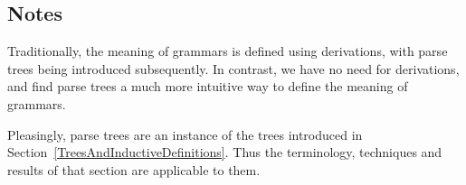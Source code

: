 \subsection{Notes}

Traditionally, the meaning of grammars is defined using derivations,
with parse trees being introduced subsequently.  In contrast, we have
no need for derivations, and find parse trees a much more intuitive
way to define the meaning of grammars.

Pleasingly, parse trees are an instance of the trees introduced in
Section~\ref{TreesAndInductiveDefinitions}.  Thus the terminology,
techniques and results of that section are applicable to them.

